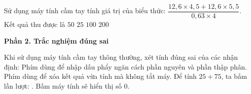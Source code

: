 \begin{ex} %
Sử dụng máy tính cầm tay tính giá trị của biểu thức: $\dfrac{12{,}6 \times 4{,}5 + 12{,}6 \times 5{,}5}{0{,}63 \times 4}$. Kết quả thu được là
\choice
{\True $50$}
{$25$}
{$100$}
{$200$}
\end{ex}

\textbf{Phần 2. Trắc nghiệm đúng sai}

\begin{ex} %
Khi sử dụng máy tính cầm tay thông thường, xét tính đúng sai của các nhận định:
\choiceTF
{\True Phím  dùng để nhập dấu phẩy ngăn cách phần nguyên và phần thập phân.}
{Phím  dùng để xóa kết quả vừa tính mà không tắt máy.}
{\True Để tính $25 + 75$, ta bấm lần lượt:  \fbox{+}  \fbox{=}.}
{Bấm  \fbox{$\div$}  \fbox{=} máy tính sẽ hiển thị số $0$.}
\end{ex}

